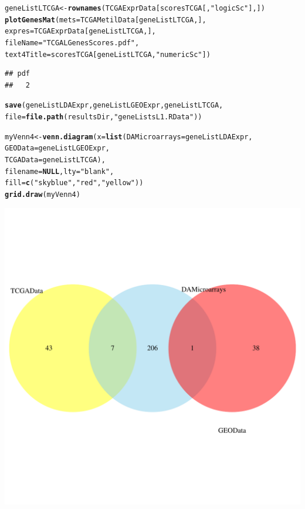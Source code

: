 \documentclass[a4paper,10pt]{article}\usepackage[]{graphicx}\usepackage[]{xcolor}
\makeatletter
\def\maxwidth{ %
  \ifdim\Gin@nat@width>\linewidth
    \linewidth
  \else
    \Gin@nat@width
  \fi
}
\newcommand{\hlstr}[1]{\textcolor[rgb]{0.192,0.494,0.8}{#1}}%
\newcommand{\hlstd}[1]{\textcolor[rgb]{0.345,0.345,0.345}{#1}}%
\newcommand{\hlkwa}[1]{\textcolor[rgb]{0.161,0.373,0.58}{\textbf{#1}}}%
\newcommand{\hlkwb}[1]{\textcolor[rgb]{0.69,0.353,0.396}{#1}}%
\newcommand{\hlkwc}[1]{\textcolor[rgb]{0.333,0.667,0.333}{#1}}%
\newcommand{\hlkwd}[1]{\textcolor[rgb]{0.737,0.353,0.396}{\textbf{#1}}}%
\newenvironment{kframe}{%
 \def\at@end@of@kframe{}%
 \ifinner\ifhmode%
  \def\at@end@of@kframe{\end{minipage}}%
  \begin{minipage}{\columnwidth}%
 \fi\fi%
 \def\FrameCommand##1{\hskip\@totalleftmargin \hskip-\fboxsep
 \colorbox{shadecolor}{##1}\hskip-\fboxsep
     \hskip-\linewidth \hskip-\@totalleftmargin \hskip\columnwidth}%
 \MakeFramed {\advance\hsize-\width
   \@totalleftmargin\z@ \linewidth\hsize
   \@setminipage}}%
 {\par\unskip\endMakeFramed%
 \at@end@of@kframe}
\newenvironment{knitrout}{}{} %
\makeatother
\begin{document}
\begin{knitrout}
\begin{kframe}
\begin{alltt}
\hlstd{geneListLTCGA} \hlkwb{<-} \hlkwd{rownames}\hlstd{(TCGAExprData[scoresTCGA[,}\hlstr{"logicSc"}\hlstd{],])}
\hlkwd{plotGenesMat} \hlstd{(}\hlkwc{mets}\hlstd{=TCGAMetilData[geneListLTCGA,],}
              \hlkwc{expres}\hlstd{=TCGAExprData[geneListLTCGA,],}
              \hlkwc{fileName} \hlstd{=}\hlstr{"TCGALGenesScores.pdf"}\hlstd{,}
              \hlkwc{text4Title} \hlstd{= scoresTCGA[geneListLTCGA,}\hlstr{"numericSc"}\hlstd{])}
\end{alltt}
\begin{verbatim}
## pdf 
##   2
\end{verbatim}
\begin{alltt}
\hlkwd{save}\hlstd{(geneListLDAExpr, geneListLGEOExpr,  geneListLTCGA,}
     \hlkwc{file}\hlstd{=}\hlkwd{file.path}\hlstd{(resultsDir,} \hlstr{"geneListsL1.RData"}\hlstd{))}

\hlstd{myVenn4}\hlkwb{<-} \hlkwd{venn.diagram}\hlstd{(}\hlkwc{x}\hlstd{=}\hlkwd{list}\hlstd{(}\hlkwc{DAMicroarrays}\hlstd{=geneListLDAExpr,}
                              \hlkwc{GEOData}\hlstd{=geneListLGEOExpr,}
                              \hlkwc{TCGAData}\hlstd{=geneListLTCGA),}
                              \hlkwc{filename}\hlstd{=}\hlkwa{NULL}\hlstd{,} \hlkwc{lty} \hlstd{=} \hlstr{"blank"}\hlstd{,}
                              \hlkwc{fill}\hlstd{=}\hlkwd{c}\hlstd{(}\hlstr{"skyblue"}\hlstd{,} \hlstr{"red"}\hlstd{,} \hlstr{"yellow"}\hlstd{))}
\hlkwd{grid.draw}\hlstd{(myVenn4)}
\end{alltt}
\end{kframe}
\includegraphics[width=\maxwidth]{figure/selectLGenes1-1} 
\end{knitrout}
\end{document}
